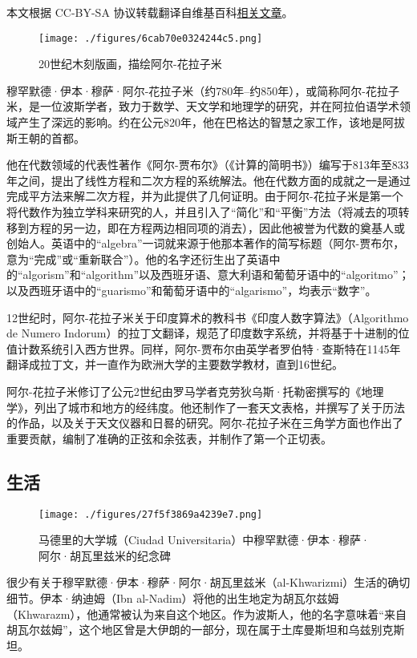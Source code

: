 
本文根据 CC-BY-SA 协议转载翻译自维基百科\href{https://en.wikipedia.org/wiki/Al-Khwarizmi}{相关文章}。

\begin{figure}[ht]
\centering
\texttt{[image: ./figures/6cab70e0324244c5.png]}
\caption{20世纪木刻版画，描绘阿尔-花拉子米} \label{fig_HLZM_1}
\end{figure}
穆罕默德·伊本·穆萨·阿尔-花拉子米（约780年–约850年），或简称阿尔-花拉子米，是一位波斯学者，致力于数学、天文学和地理学的研究，并在阿拉伯语学术领域产生了深远的影响。约在公元820年，他在巴格达的智慧之家工作，该地是阿拔斯王朝的首都。

他在代数领域的代表性著作《阿尔-贾布尔》（《计算的简明书》）编写于813年至833年之间，提出了线性方程和二次方程的系统解法。他在代数方面的成就之一是通过完成平方法来解二次方程，并为此提供了几何证明。由于阿尔-花拉子米是第一个将代数作为独立学科来研究的人，并且引入了“简化”和“平衡”方法（将减去的项转移到方程的另一边，即在方程两边相同项的消去），因此他被誉为代数的奠基人或创始人。英语中的“algebra”一词就来源于他那本著作的简写标题（阿尔-贾布尔，意为“完成”或“重新联合”）。他的名字还衍生出了英语中的“algorism”和“algorithm”以及西班牙语、意大利语和葡萄牙语中的“algoritmo”；以及西班牙语中的“guarismo”和葡萄牙语中的“algarismo”，均表示“数字”。

12世纪时，阿尔-花拉子米关于印度算术的教科书《印度人数字算法》（Algorithmo de Numero Indorum）的拉丁文翻译，规范了印度数字系统，并将基于十进制的位值计数系统引入西方世界。同样，阿尔-贾布尔由英学者罗伯特·查斯特在1145年翻译成拉丁文，并一直作为欧洲大学的主要数学教材，直到16世纪。

阿尔-花拉子米修订了公元2世纪由罗马学者克劳狄乌斯·托勒密撰写的《地理学》，列出了城市和地方的经纬度。他还制作了一套天文表格，并撰写了关于历法的作品，以及关于天文仪器和日晷的研究。阿尔-花拉子米在三角学方面也作出了重要贡献，编制了准确的正弦和余弦表，并制作了第一个正切表。
\subsection{生活}
\begin{figure}[ht]
\centering
\texttt{[image: ./figures/27f5f3869a4239e7.png]}
\caption{马德里的大学城（Ciudad Universitaria）中穆罕默德·伊本·穆萨·阿尔·胡瓦里兹米的纪念碑} \label{fig_HLZM_2}
\end{figure}
很少有关于穆罕默德·伊本·穆萨·阿尔·胡瓦里兹米（al-Khwarizmi）生活的确切细节。伊本·纳迪姆（Ibn al-Nadim）将他的出生地定为胡瓦尔兹姆（Khwarazm），他通常被认为来自这个地区。作为波斯人，他的名字意味着“来自胡瓦尔兹姆”，这个地区曾是大伊朗的一部分，现在属于土库曼斯坦和乌兹别克斯坦。

